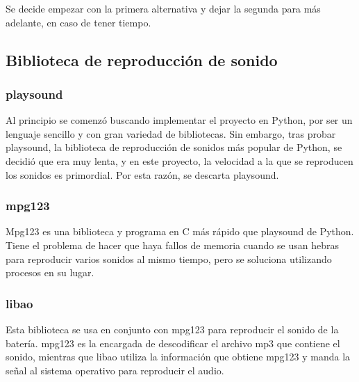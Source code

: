         Se decide empezar con la primera alternativa y dejar la segunda para más adelante, en caso de tener tiempo.

        \subsection{Biblioteca de reproducción de sonido} %
        \label{sub:LibreriaDeReproduccionDeSonido}

            \subsubsection{playsound} %
            \label{ssub:Playsound}

                Al principio se comenzó buscando implementar el proyecto en Python, por ser un lenguaje sencillo y con
                gran variedad de bibliotecas. Sin embargo, tras probar playsound\cite{playsound}, la biblioteca de
                reproducción de sonidos más popular de Python, se decidió que era muy lenta, y en este proyecto, la
                velocidad a la que se reproducen los sonidos es primordial. Por esta razón, se descarta playsound.


            \subsubsection{mpg123} %
            \label{ssub:Mpg123}

                Mpg123\cite{mpg123} es una biblioteca y programa en C más rápido que playsound de Python. Tiene el problema de
                hacer que haya fallos de memoria cuando se usan hebras para reproducir varios sonidos al mismo tiempo, pero
                se soluciona utilizando procesos en su lugar.


            \subsubsection{libao} %
            \label{ssub:Libao}

                Esta biblioteca se usa en conjunto con mpg123 para reproducir el sonido de la batería.
                mpg123 es la encargada de descodificar el archivo mp3 que contiene el sonido, mientras que
                libao\cite{libao} utiliza la información que obtiene mpg123 y manda la señal al sistema operativo para
                reproducir el audio.

